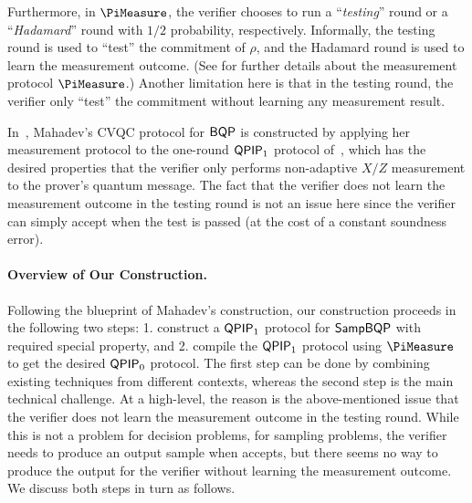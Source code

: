 Furthermore, in $\PiMeasure$, the verifier chooses to run a ``\emph{testing}'' round or a ``\emph{Hadamard}'' round with $1/2$ probability, respectively. Informally, the testing round is used to ``test'' the commitment of $\rho$, and the Hadamard round is used to learn the measurement outcome. (See  for further details about the measurement protocol $\PiMeasure$.) Another limitation here is that in the testing round, the verifier only ``test'' the commitment without learning any measurement result. 

In~\cite{FOCS:Mahadev18a}, Mahadev's CVQC protocol for $\operatorname{\mathsf{BQP}}$ is constructed by applying her measurement protocol to the one-round $\operatorname{\mathsf{QPIP}}_1$ protocol of~\cite{PhysRevA.93.022326, mf16}, which has the desired properties that the verifier only performs non-adaptive $X/Z$ measurement to the prover's quantum message. The fact that the verifier does not learn the measurement outcome in the testing round is not an issue here since the verifier can simply accept when the test is passed (at the cost of a constant soundness error).

\paragraph{Overview of Our Construction.}
Following the blueprint of Mahadev's construction, our construction proceeds in the following two steps: 1. construct a $\operatorname{\mathsf{QPIP}}_1$ protocol for $\operatorname{\mathsf{SampBQP}}$ with required special property, and 2. compile the $\operatorname{\mathsf{QPIP}}_1$ protocol using $\PiMeasure$ to get the desired $\operatorname{\mathsf{QPIP}}_0$ protocol. The first step can be done by combining existing techniques from different contexts, whereas the second step is the main technical challenge.
At a high-level, the reason is the above-mentioned issue that the verifier does not learn the measurement outcome in the testing round. While this is not a problem for decision problems, %
for sampling problems, the verifier needs to produce an output sample when accepts, but there seems no way to produce the output for the verifier without learning the measurement outcome.   
%
We discuss both steps in turn as follows.


